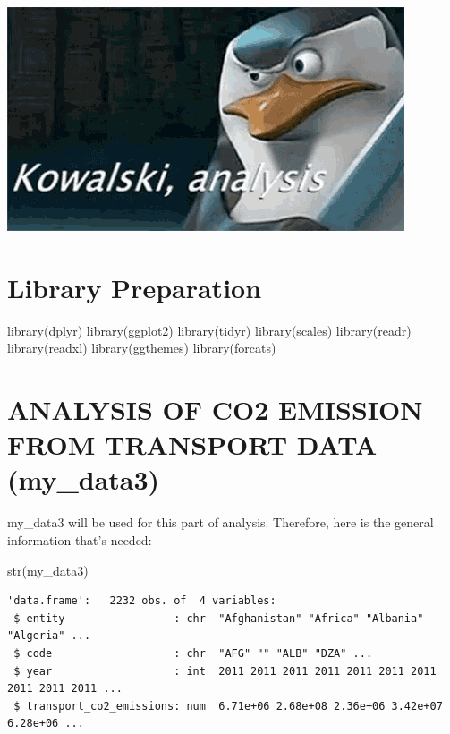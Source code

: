 \documentclass[
  11pt,
  a4paper,
  DIV=11,
  numbers=noendperiod]{scrartcl}
\author{}
\date{}
\newenvironment{Shaded}{\begin{snugshade}}{\end{snugshade}}
\newcommand{\FunctionTok}[1]{\textcolor[rgb]{0.28,0.35,0.67}{#1}}
\newcommand{\NormalTok}[1]{\textcolor[rgb]{0.00,0.23,0.31}{#1}}
\begin{document}
\begin{center}
\includegraphics{docs/kowalski-analysis-thinking.gif}
\end{center}

\section{Library Preparation}\label{library-preparation}

\begin{Shaded}
\begin{Highlighting}[]
\FunctionTok{library}\NormalTok{(dplyr)}
\FunctionTok{library}\NormalTok{(ggplot2)}
\FunctionTok{library}\NormalTok{(tidyr)}
\FunctionTok{library}\NormalTok{(scales)}
\FunctionTok{library}\NormalTok{(readr)}
\FunctionTok{library}\NormalTok{(readxl)}
\FunctionTok{library}\NormalTok{(ggthemes)}
\FunctionTok{library}\NormalTok{(forcats)}
\end{Highlighting}
\end{Shaded}

\section{ANALYSIS OF CO2 EMISSION FROM TRANSPORT DATA
(my\_data3)}\label{analysis-of-co2-emission-from-transport-data-my_data3}

my\_data3 will be used for this part of analysis. Therefore, here is the
general information that's needed:

\begin{Shaded}
\begin{Highlighting}[]
\FunctionTok{str}\NormalTok{(my\_data3)}
\end{Highlighting}
\end{Shaded}

\begin{verbatim}
'data.frame':   2232 obs. of  4 variables:
 $ entity                 : chr  "Afghanistan" "Africa" "Albania" "Algeria" ...
 $ code                   : chr  "AFG" "" "ALB" "DZA" ...
 $ year                   : int  2011 2011 2011 2011 2011 2011 2011 2011 2011 2011 ...
 $ transport_co2_emissions: num  6.71e+06 2.68e+08 2.36e+06 3.42e+07 6.28e+06 ...
\end{verbatim}
\end{document}
